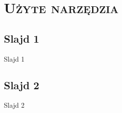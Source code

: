 \section{\scshape Użyte narzędzia}

\subsection{Slajd 1}
\begin{frame}{Slajd 1}
\end{frame}

\subsection{Slajd 2}
\begin{frame}{Slajd 2}
\end{frame}